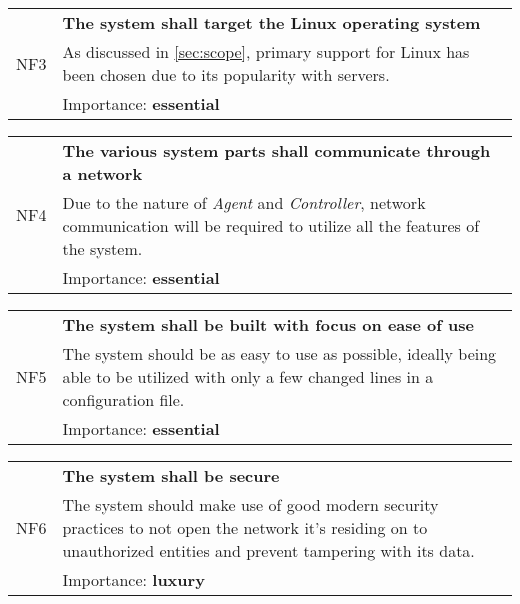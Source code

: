         \vspace{0.5cm}
        \noindent
        \begin{tabular}{ p{0.7cm}|p{14.5cm} }
            \multirow{3}{*}{NF3} & \textbf{The system shall target the Linux operating system}\\
            \cline{2-2}
            & As discussed in \autoref{sec:scope}, primary support for Linux has been chosen due to its popularity with servers.\\
            \cline{2-2}
            & Importance: \textbf{essential}
        \end{tabular}

        \vspace{0.5cm}
        \noindent
        \begin{tabular}{ p{0.7cm}|p{14.5cm} }
            \multirow{3}{*}{NF4} & \textbf{The various system parts shall communicate through a network}\\
            \cline{2-2}
            & Due to the nature of \textit{Agent} and \textit{Controller}, network communication will be required to utilize all the features of the system.\\
            \cline{2-2}
            & Importance: \textbf{essential}
        \end{tabular}

        \vspace{0.5cm}
        \noindent
        \begin{tabular}{ p{0.7cm}|p{14.5cm} }
            \multirow{3}{*}{NF5} & \textbf{The system shall be built with focus on ease of use}\\
            \cline{2-2}
            & The system should be as easy to use as possible, ideally being able to be utilized with only a few changed lines in a configuration file.\\
            \cline{2-2}
            & Importance: \textbf{essential}
        \end{tabular}

        \vspace{0.5cm}
        \noindent
        \begin{tabular}{ p{0.7cm}|p{14.5cm} }
            \multirow{3}{*}{NF6} & \textbf{The system shall be secure}\\
            \cline{2-2}
            & The system should make use of good modern security practices to not open the network it's residing on to unauthorized entities and prevent tampering with its data.\\
            \cline{2-2}
            & Importance: \textbf{luxury}
        \end{tabular}

